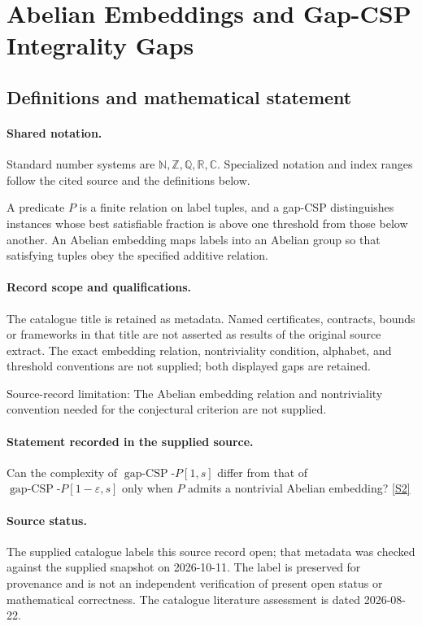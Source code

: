 \documentclass[11pt]{article}
\newcommand{\sref}[2]{\hyperlink{source:#1:#2}{[S#2]}}
\begin{document}
\section{Abelian Embeddings and Gap-CSP Integrality Gaps}\label{statement}

\subsection{Definitions and mathematical statement}

\paragraph{Shared notation.}Standard number systems are $\mathbb N,\mathbb Z,\mathbb Q,\mathbb R,\mathbb C$. Specialized notation and index ranges follow the cited source and the definitions below.


A predicate $P$ is a finite relation on label tuples, and a gap-CSP distinguishes instances whose best satisfiable fraction is above one threshold from those below another. An Abelian embedding maps labels into an Abelian group so that satisfying tuples obey the specified additive relation.
\paragraph{Record scope and qualifications.}
The catalogue title is retained as metadata. Named certificates, contracts, bounds or frameworks in that title are not asserted as results of the original source extract.
The exact embedding relation, nontriviality condition, alphabet, and threshold conventions are not supplied; both displayed gaps are retained.

Source-record limitation: The Abelian embedding relation and nontriviality convention needed for the conjectural criterion are not supplied.
\paragraph{Statement recorded in the supplied source.}
Can the complexity of $\operatorname{gap-CSP}\text{-}P[1,s]$ differ from that of $\operatorname{gap-CSP}\text{-}P[1-\varepsilon,s]$ only when $P$ admits a nontrivial Abelian embedding? \sref{statement}{2}
\paragraph{Source status.}
The supplied catalogue labels this source record open; that metadata was checked against the supplied snapshot on 2026-10-11. The label is preserved for provenance and is not an independent verification of present open status or mathematical correctness. The catalogue literature assessment is dated 2026-08-22.
\end{document}
